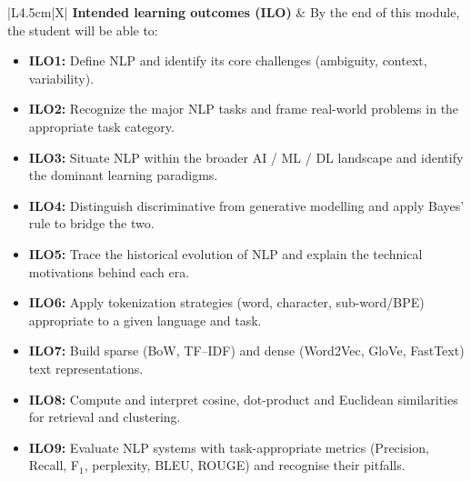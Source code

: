 \documentclass[11pt,a4paper]{article}
\begin{document}
\noindent
\begin{tabularx}{\textwidth}{|L{4.5cm}|X|}
\hline
\textbf{Intended learning outcomes (ILO)} &
By the end of this module, the student will be able to:
\begin{itemize}[noitemsep,topsep=0pt,leftmargin=*]
    \item \textbf{ILO1:} Define NLP and identify its core challenges (ambiguity, context, variability).
    \item \textbf{ILO2:} Recognize the major NLP tasks and frame real-world problems in the appropriate task category.
    \item \textbf{ILO3:} Situate NLP within the broader AI / ML / DL landscape and identify the dominant learning paradigms.
    \item \textbf{ILO4:} Distinguish discriminative from generative modelling and apply Bayes' rule to bridge the two.
    \item \textbf{ILO5:} Trace the historical evolution of NLP and explain the technical motivations behind each era.
    \item \textbf{ILO6:} Apply tokenization strategies (word, character, sub-word/BPE) appropriate to a given language and task.
    \item \textbf{ILO7:} Build sparse (BoW, TF--IDF) and dense (Word2Vec, GloVe, FastText) text representations.
    \item \textbf{ILO8:} Compute and interpret cosine, dot-product and Euclidean similarities for retrieval and clustering.
    \item \textbf{ILO9:} Evaluate NLP systems with task-appropriate metrics (Precision, Recall, F$_1$, perplexity, BLEU, ROUGE) and recognise their pitfalls.
\end{itemize} \\
\hline
\end{tabularx}

\vspace{0.3cm}
\end{document}
